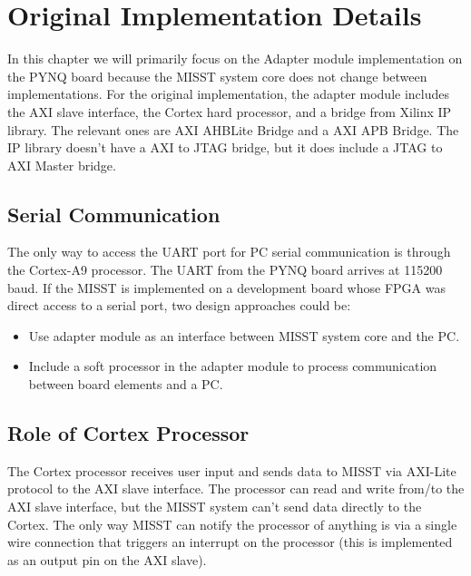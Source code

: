 \documentclass[]{report}
\begin{document}
\chapter{Original Implementation Details}
\label{c original imp details}

In this chapter we will primarily focus on the Adapter module implementation on the PYNQ board because the MISST system core does not change between implementations. For the original implementation, the adapter module includes the AXI slave interface, the Cortex hard processor, and a bridge from Xilinx IP library. The relevant ones are AXI AHBLite Bridge and a AXI APB Bridge. The IP library doesn't have a AXI to JTAG bridge, but it does include a JTAG to AXI Master bridge.   

\section{Serial Communication}
The only way to access the UART port for PC serial communication is through the Cortex-A9 processor. The UART from the PYNQ board arrives at 115200 baud. If the MISST is implemented on a development board whose FPGA was direct access to a serial port, two design approaches could be:
\begin{itemize}
	\item Use adapter module as an interface between MISST system core and the PC.
	\item Include a soft processor in the adapter module to process communication between board elements and a PC.
\end{itemize}


\section{Role of Cortex Processor}
 The Cortex processor receives user input and sends data to MISST via AXI-Lite protocol to the AXI slave interface. The processor can read and write from/to the AXI slave interface, but the MISST system can't send data directly to the Cortex. The only way MISST can notify the processor of anything is via a single wire connection that triggers an interrupt on the processor (this is implemented as an output pin on the AXI slave). 
 
\end{document}
